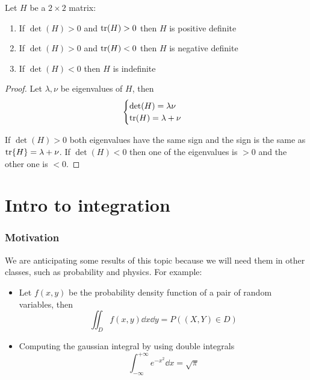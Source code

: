 \documentclass[14pt]{extarticle}
\begin{document}
\begin{lemma}[$d = 2$]
    Let $H$ be a $2 \times 2$ matrix:
    \begin{enumerate}[label=\roman*.]
        \item If $\det(H) > 0$ and $\tr(H) > 0$ then $H$ is positive definite
        \item If $\det(H) > 0$ and $\tr(H) < 0$ then $H$ is negative definite
        \item If $\det(H) < 0$ then $H$ is indefinite
    \end{enumerate}
\end{lemma}

\begin{proof}
    Let $\lambda, \nu$ be eigenvalues of $H$, then
    \begin{equation}
        \begin{cases}
            \det(H) = \lambda \nu \\
            \tr(H) = \lambda + \nu
        \end{cases}
    \end{equation}

    If $\det(H) > 0$ both eigenvalues have the same sign and the sign is the same as $\tr{H} = \lambda + \nu$.
    If $\det(H) < 0$ then one of the eigenvalues is $> 0$ and the other one is $< 0$.
\end{proof}

\section{Intro to integration}

\subsubsection{Motivation}

We are anticipating some results of this topic because we will need them in other classes, such as probability and physics.
For example:
\begin{itemize}
    \item Let $f(x, y)$ be the probability density function of a pair of random variables, then
          \begin{equation}
              \iint_D f(x, y) \dd{x} \dd{y} = P((X, Y) \in D)
          \end{equation}
    \item Computing the gaussian integral by using double integrals
          \begin{equation}
              \int_{-\infty}^{+\infty} e^{-x^2} \dd{x} = \sqrt{\pi}
          \end{equation}
\end{itemize}
\end{document}
